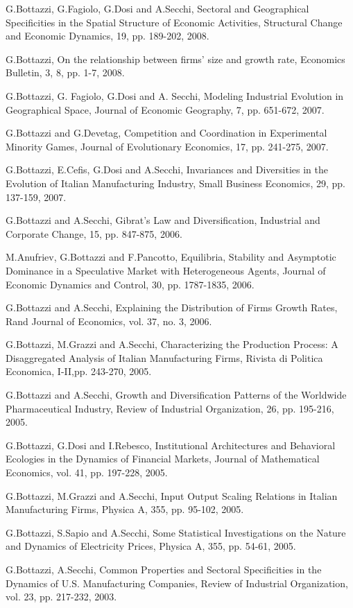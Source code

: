 \documentclass[a4paper]{article}
\begin{document}
G.Bottazzi, G.Fagiolo, G.Dosi and A.Secchi, Sectoral and Geographical
Specificities in the Spatial Structure of Economic Activities,
Structural Change and Economic Dynamics, 19, pp. 189-202, 2008.

G.Bottazzi, On the relationship between firms' size and growth rate,
Economics Bulletin, 3, 8, pp. 1-7, 2008.

G.Bottazzi, G. Fagiolo, G.Dosi and A. Secchi, Modeling Industrial
Evolution in Geographical Space, Journal of Economic Geography,
7, pp. 651-672, 2007.

G.Bottazzi and G.Devetag, Competition and Coordination in Experimental
Minority Games, Journal of Evolutionary Economics, 17, pp. 241-275,
2007.

G.Bottazzi, E.Cefis, G.Dosi and A.Secchi, Invariances and Diversities
in the Evolution of Italian Manufacturing Industry, Small Business
Economics, 29, pp. 137-159, 2007.

G.Bottazzi and A.Secchi, Gibrat's Law and Diversification, Industrial
and Corporate Change, 15, pp. 847-875, 2006.

M.Anufriev, G.Bottazzi and F.Pancotto, Equilibria, Stability and
Asymptotic Dominance in a Speculative Market with Heterogeneous
Agents, Journal of Economic Dynamics and Control, 30, pp. 1787-1835,
2006.

G.Bottazzi and A.Secchi, Explaining the Distribution of Firms Growth
Rates, Rand Journal of Economics, vol. 37, no. 3, 2006.

G.Bottazzi, M.Grazzi and A.Secchi, Characterizing the Production
Process: A Disaggregated Analysis of Italian Manufacturing Firms,
Rivista di Politica Economica, I-II,pp.  243-270, 2005.

G.Bottazzi and A.Secchi, Growth and Diversification Patterns of the
Worldwide Pharmaceutical Industry, Review of Industrial Organization,
26, pp. 195-216, 2005.

G.Bottazzi, G.Dosi and I.Rebesco, Institutional Architectures and
Behavioral Ecologies in the Dynamics of Financial Markets, Journal of
Mathematical Economics, vol. 41, pp.  197-228, 2005.

G.Bottazzi, M.Grazzi and A.Secchi, Input Output Scaling Relations in
Italian Manufacturing Firms, Physica A, 355, pp.  95-102, 2005.

G.Bottazzi, S.Sapio and A.Secchi, Some Statistical Investigations on
the Nature and Dynamics of Electricity Prices, Physica A, 355, pp.
54-61, 2005.

G.Bottazzi, A.Secchi, Common Properties and Sectoral Specificities in
the Dynamics of U.S. Manufacturing Companies, Review of Industrial
Organization, vol. 23, pp. 217-232, 2003.
\end{document}
